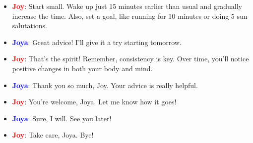 \documentclass{article}
\begin{document}
\begin{itemize}
    \item \textbf{\textcolor{red}{Joy}}: Start small. Wake up just 15 minutes earlier than usual and gradually increase the time. Also, set a goal, like running for 10 minutes or doing 5 sun salutations.
    \item \textbf{\textcolor{blue}{Joya}}: Great advice! I’ll give it a try starting tomorrow.
    \item \textbf{\textcolor{red}{Joy}}: That’s the spirit! Remember, consistency is key. Over time, you’ll notice positive changes in both your body and mind.
    \item \textbf{\textcolor{blue}{Joya}}: Thank you so much, Joy. Your advice is really helpful.
    \item \textbf{\textcolor{red}{Joy}}: You’re welcome, Joya. Let me know how it goes!
    \item \textbf{\textcolor{blue}{Joya}}: Sure, I will. See you later!
    \item \textbf{\textcolor{red}{Joy}}: Take care, Joya. Bye!
\end{itemize}
\end{document}
